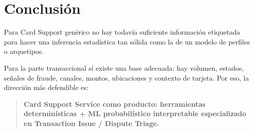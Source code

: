 \documentclass[11pt,a4paper]{article}
\begin{document}
\section{Conclusión}

Para Card Support genérico no hay todavía suficiente información etiquetada para hacer una inferencia estadística tan sólida como la de un modelo de perfiles o arquetipos.

Para la parte transaccional sí existe una base adecuada: hay volumen, estados, señales de fraude, canales, montos, ubicaciones y contexto de tarjeta. Por eso, la dirección más defendible es:

\begin{quote}
\textbf{Card Support Service como producto: herramientas determinísticas + ML probabilístico interpretable especializado en Transaction Issue / Dispute Triage.}
\end{quote}
\end{document}

